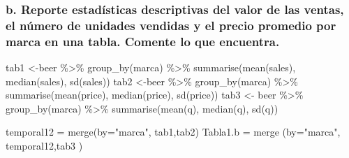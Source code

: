 \documentclass[
]{article}
\newenvironment{Shaded}{\begin{snugshade}}{\end{snugshade}}
\newcommand{\AttributeTok}[1]{\textcolor[rgb]{0.77,0.63,0.00}{#1}}
\newcommand{\FunctionTok}[1]{\textcolor[rgb]{0.00,0.00,0.00}{#1}}
\newcommand{\NormalTok}[1]{#1}
\newcommand{\OtherTok}[1]{\textcolor[rgb]{0.56,0.35,0.01}{#1}}
\newcommand{\SpecialCharTok}[1]{\textcolor[rgb]{0.00,0.00,0.00}{#1}}
\newcommand{\StringTok}[1]{\textcolor[rgb]{0.31,0.60,0.02}{#1}}
\begin{document}
\hypertarget{b.-reporte-estaduxedsticas-descriptivas-del-valor-de-las-ventas-el-nuxfamero-de-unidades-vendidas-y-el-precio-promedio-por-marca-en-una-tabla.-comente-lo-que-encuentra.}{%
\subsubsection{b. Reporte estadísticas descriptivas del valor de las
ventas, el número de unidades vendidas y el precio promedio por marca en
una tabla. Comente lo que
encuentra.}\label{b.-reporte-estaduxedsticas-descriptivas-del-valor-de-las-ventas-el-nuxfamero-de-unidades-vendidas-y-el-precio-promedio-por-marca-en-una-tabla.-comente-lo-que-encuentra.}}

\begin{Shaded}
\begin{Highlighting}[]
\NormalTok{tab1 }\OtherTok{\textless{}{-}}\NormalTok{beer }\SpecialCharTok{\%\textgreater{}\%}    \FunctionTok{group\_by}\NormalTok{(marca) }\SpecialCharTok{\%\textgreater{}\%}    \FunctionTok{summarise}\NormalTok{(}\FunctionTok{mean}\NormalTok{(sales),             }\FunctionTok{median}\NormalTok{(sales),             }\FunctionTok{sd}\NormalTok{(sales))}
\NormalTok{tab2 }\OtherTok{\textless{}{-}}\NormalTok{beer }\SpecialCharTok{\%\textgreater{}\%}    \FunctionTok{group\_by}\NormalTok{(marca) }\SpecialCharTok{\%\textgreater{}\%}    \FunctionTok{summarise}\NormalTok{(}\FunctionTok{mean}\NormalTok{(price),             }\FunctionTok{median}\NormalTok{(price),             }\FunctionTok{sd}\NormalTok{(price))}
\NormalTok{tab3 }\OtherTok{\textless{}{-}}\NormalTok{ beer }\SpecialCharTok{\%\textgreater{}\%}    \FunctionTok{group\_by}\NormalTok{(marca) }\SpecialCharTok{\%\textgreater{}\%}    \FunctionTok{summarise}\NormalTok{(}\FunctionTok{mean}\NormalTok{(q),             }\FunctionTok{median}\NormalTok{(q),             }\FunctionTok{sd}\NormalTok{(q))}

\NormalTok{temporal12 }\OtherTok{=} \FunctionTok{merge}\NormalTok{(}\AttributeTok{by=}\StringTok{"marca"}\NormalTok{, tab1,tab2)}
\NormalTok{Tabla1.b }\OtherTok{=} \FunctionTok{merge}\NormalTok{ (}\AttributeTok{by=}\StringTok{"marca"}\NormalTok{, temporal12,tab3 )}
\end{Highlighting}
\end{Shaded}
\end{document}
